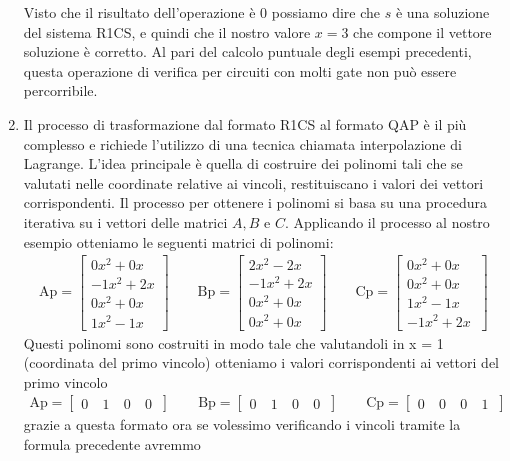 \begin{enumerate}
    Visto che il risultato dell'operazione è 0 possiamo dire che $s$ è una soluzione del sistema R1CS, e quindi che il
    nostro valore $x=3$ che compone il vettore soluzione è corretto. Al pari del calcolo puntuale degli esempi
    precedenti, questa operazione di verifica per circuiti con molti gate non può essere percorribile.

    \item  Il processo di trasformazione dal formato R1CS al formato QAP è il più complesso e richiede l'utilizzo di una
    tecnica chiamata interpolazione di Lagrange. L'idea principale è quella di costruire dei polinomi tali che se
    valutati nelle coordinate relative ai vincoli, restituiscano i valori dei vettori corrispondenti. Il processo per
    ottenere i polinomi si basa su una procedura iterativa su i vettori delle matrici $A,B$ e $C$. 
    Applicando il processo al nostro esempio otteniamo le seguenti matrici di polinomi:
    \begin{gather*}
        \text{Ap} =
        \begin{bmatrix}
        0x^2+0x \\
        -1x^2+2x \\
        0x^2+0x \\
        1x^2-1x \
        \end{bmatrix}
        \qquad
        \text{Bp} =
        \begin{bmatrix}
        2x^2-2x \\
        -1x^2+2x \\
        0x^2+0x \\
        0x^2+0x \
        \end{bmatrix}
        \qquad
        \text{Cp} =
        \begin{bmatrix}
        0x^2+0x \\
        0x^2+0x \\
        1x^2-1x \\
        -1x^2+2x \
        \end{bmatrix}
    \end{gather*}    
    Questi polinomi sono costruiti in modo tale che valutandoli in x = 1 (coordinata del primo vincolo) otteniamo i valori corrispondenti ai vettori del
    primo vincolo
    \begin{gather*}
        \text{Ap} =
        \begin{bmatrix}
        0&\
        1&\
        0&\
        0\
        \end{bmatrix}
        \qquad
        \text{Bp} =
        \begin{bmatrix}
        0&\
        1&\
        0&\
        0\
        \end{bmatrix}
        \qquad
        \text{Cp} =
        \begin{bmatrix}
        0&\
        0&\
        0&\
        1\
        \end{bmatrix}
    \end{gather*}
    grazie a questa formato ora se volessimo verificando i vincoli tramite la formula precedente avremmo
    

\end{enumerate}
